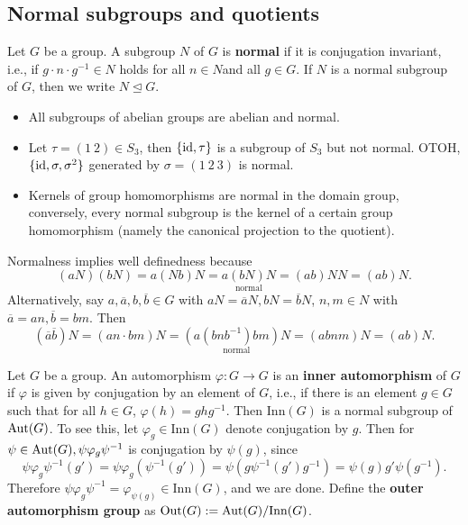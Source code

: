 \subsection{Normal subgroups and quotients}
\begin{definition}
    Let $G$ be a group. A subgroup $N$ of $G$ is \textbf{normal} if it is conjugation invariant, i.e., if $g \cdot n \cdot  g^{-1} \in N$ holds for all $n \in N$and all $g \in G$. If $N$ is a normal subgroup of $G$, then we write $N \trianglelefteq G$.
\end{definition}
\begin{example}
    \begin{itemize}
    \setlength\itemsep{-.2em}
        \item All subgroups of abelian groups are abelian and normal.
        \item Let $\tau = (1\ 2)\in S_3$, then $\{\operatorname{id}, \tau\} $ is a subgroup of $S_3$ but not normal. OTOH, $\{\operatorname{id}, \sigma,\sigma^2\} $ generated by $\sigma = (1\ 2\ 3)$ is normal.
        \item Kernels of group homomorphisms are normal in the domain group, conversely, every normal subgroup is the kernel of a certain group homomorphism (namely the canonical projection to the quotient).
    \end{itemize}
\end{example}
Normalness implies well definedness because \[
    (aN)(bN) = a(Nb)N=\underset{\text{normal} }{a(bN)N} =(ab)NN = (ab) N.
\] Alternatively, say $a,\overline{a},b,\overline{b} \in G$ with $aN= \overline{a}N, bN=\overline{b}N$, $n,m \in N$ with $\overline{a}=an, \overline{b}=bm$. Then \[
(\overline{a}\overline{b})N= (an\cdot bm)N=\underset{\text{normal} }{(a(bnb^{-1})bm)N} =(abnm)N=(ab)N.
\] 
\begin{example}
    Let $G$ be a group. An automorphism $\varphi  \colon G \to G$ is an \textbf{inner automorphism} of $G$ if $\varphi $ is given by conjugation by an element of $G$, i.e., if there is an element $g \in G$ such that for all $h \in G$, $\varphi (h) = g h g^{-1}$. Then $\mathrm{Inn}(G)$ is a normal subgroup of $\mathrm{Aut}(G)$. To see this, let  $\varphi _g \in \mathrm{Inn}(G)$ denote conjugation by $g$. Then for $\psi \in \mathrm{Aut}(G), \psi \varphi _g \psi ^{-1}$ is conjugation by $\psi(g)$, since \[
        \psi \varphi _g\psi ^{-1}(g')=\psi\varphi _g (\psi ^{-1}(g'))= \psi\left( g \psi ^{-1}(g') g^{-1} \right) =\psi(g) g' \psi (g^{-1}).
    \] Therefore $\psi \varphi _g \psi ^{-1} = \varphi  _{\psi(g)} \in \mathrm{Inn}(G)$, and we are done. Define the \textbf{outer automorphism group} as $\mathrm{Out}(G) := \mathrm{Aut} (G) / \mathrm{Inn}(G)$.
\end{example}

